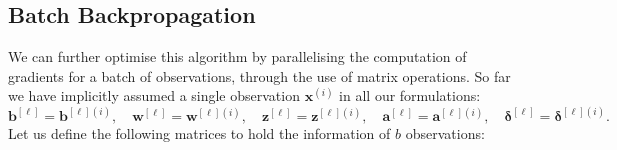 \documentclass{article}
\begin{document}
\subsection{Batch Backpropagation}
We can further optimise this algorithm by parallelising the computation
of gradients for a batch of observations, through the use of matrix
operations. So far we have implicitly assumed a single observation
\(\symbf{x}^{\left( i \right)}\) in all our formulations:
\begin{equation*}
    \symbf{b}^{\left[ \ell \right]} = \symbf{b}^{\left[ \ell \right] \left( i \right)}, \quad \symbf{w}^{\left[ \ell \right]} = \symbf{w}^{\left[ \ell \right] \left( i \right)}, \quad \symbf{z}^{\left[ \ell \right]} = \symbf{z}^{\left[ \ell \right] \left( i \right)}, \quad \symbf{a}^{\left[ \ell \right]} = \symbf{a}^{\left[ \ell \right] \left( i \right)}, \quad \symbf{\delta}^{\left[ \ell \right]} = \symbf{\delta}^{\left[ \ell \right] \left( i \right)}.
\end{equation*}
Let us define the following matrices to hold the information of \(b\)
observations:
\end{document}
